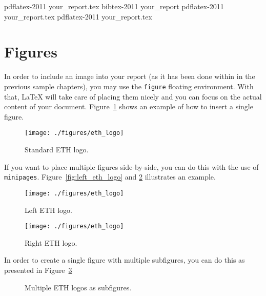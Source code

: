 \begin{shellenv}
pdflatex-2011 your_report.tex
bibtex-2011 your_report
pdflatex-2011 your_report.tex
pdflatex-2011 your_report.tex
\end{shellenv}


\section{Figures}
\label{sec:figures}

In order to include an image into your report (as it has been done
within in the previous sample chapters), you may use the
\texttt{figure} floating environment. With that, \LaTeX{} will take
care of placing them nicely and you can focus on the actual content of
your document. Figure~\ref{fig:std_eth_logo} shows an example of how
to insert a single figure.

\begin{figure}[htbp]
 \centering\texttt{[image: ./figures/eth\_logo]}
 \caption{Standard ETH logo.}
 \label{fig:std_eth_logo}
\end{figure}

If you want to place multiple figures side-by-side, you can do this
with the use of \texttt{minipages}. Figure~\ref{fig:left_eth_logo} and
\ref{fig:right_eth_logo} illustrates an example.

\begin{figure}[htbp]
 \begin{minipage}[t]{0.45\linewidth}
  \centering\texttt{[image: ./figures/eth\_logo]}
  \caption{Left ETH logo.}
  \label{fig:left_eth_logo}
 \end{minipage}\hfill
 \begin{minipage}[t]{0.45\linewidth}
  \centering\texttt{[image: ./figures/eth\_logo]}
  \caption{Right ETH logo.}
  \label{fig:right_eth_logo}
 \end{minipage}
\end{figure}

In order to create a single figure with multiple subfigures, you can
do this as presented in Figure~\ref{fig:eth_logo_sub}

\begin{figure}[htbp]
 \centering
 \hfill
 \hfill
 \caption{Multiple ETH logos as subfigures.}
 \label{fig:eth_logo_sub}
\end{figure}


